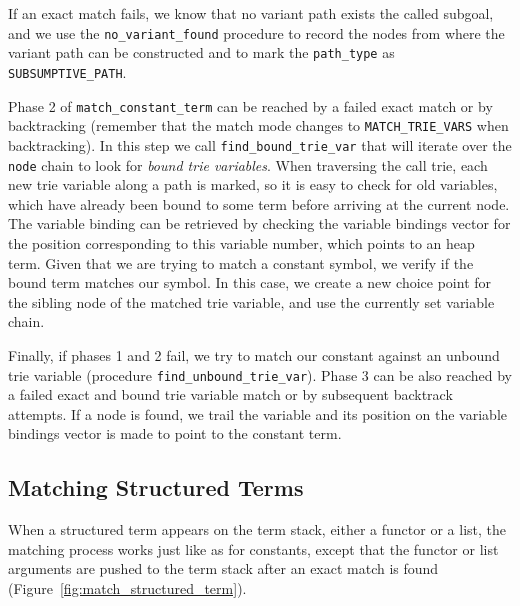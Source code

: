 If an exact match fails, we know that no variant path exists the called subgoal, and we use the
\texttt{no\_variant\_found} procedure to record the nodes from where the variant path can be
constructed and to mark the \texttt{path\_type} as \texttt{SUBSUMPTIVE\_PATH}.

Phase 2 of \texttt{match\_constant\_term} can be reached by a failed exact match or by backtracking
(remember that the match mode changes to \texttt{MATCH\_TRIE\_VARS} when backtracking). In this step
we call \texttt{find\_bound\_trie\_var} that will iterate over the \texttt{node} chain to look for
\textit{bound trie variables}. When traversing the call trie, each new trie variable
along a path is marked, so it is easy to check for old variables, which have already been bound
to some term before arriving at the current node. The variable binding can be retrieved by
checking the variable bindings vector for the position corresponding to this variable
number, which points to an heap term. Given that we are trying to match a constant symbol,
we verify if the bound term matches our symbol. In this case, we create a new choice point
for the sibling node of the matched trie variable, and use the currently set variable chain.

Finally, if phases 1 and 2 fail, we try to match our constant against an unbound trie variable
(procedure \texttt{find\_unbound\_trie\_var}).
Phase 3 can be also reached by a failed exact and bound trie variable match or by subsequent backtrack
attempts. If a node is found, we trail the variable and its position on the variable bindings
vector is made to point to the constant term.

\subsection{Matching Structured Terms}

When a structured term appears on the term stack, either a functor or a list, the matching
process works just like as for constants, except that the functor or list arguments are
pushed to the term stack after an exact match is found (Figure~\ref{fig:match_structured_term}).

